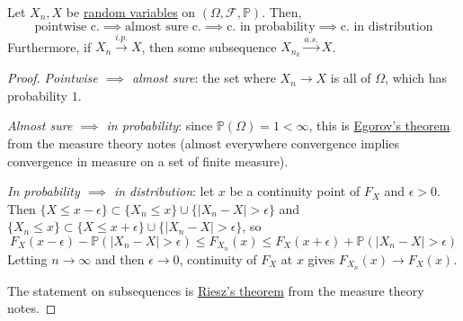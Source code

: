   \begin{theorem}
    \label{thm:hierarchy-of-convergence}
    Let $X_n, X$ be \hyperref[def:random-variable]{random variables} on $(\Omega, \mathcal{F}, \mathbb{P})$. Then, 
    \begin{equation}
      \text{pointwise c.} \implies \text{almost sure c.} \implies \text{c. in probability} \implies \text{c. in distribution}
    \end{equation}
    Furthermore, if $X_n \xrightarrow{i.p.} X$, then some subsequence $X_{n_k} \xrightarrow{a.s.} X$. 
  \end{theorem}
  \begin{proof}
    \textit{Pointwise $\implies$ almost sure}: the set where $X_n \to X$ is all of $\Omega$, which has probability $1$. 

    \textit{Almost sure $\implies$ in probability}: since $\mathbb{P}(\Omega) = 1 < \infty$, this is \hyperref[mt-thm:egorovs-theorem]{Egorov's theorem} from the measure theory notes (almost everywhere convergence implies convergence in measure on a set of finite measure). 

    \textit{In probability $\implies$ in distribution}: let $x$ be a continuity point of $F_X$ and $\epsilon > 0$. Then $\{X \leq x - \epsilon\} \subset \{X_n \leq x\} \cup \{|X_n - X| > \epsilon\}$ and $\{X_n \leq x\} \subset \{X \leq x + \epsilon\} \cup \{|X_n - X| > \epsilon\}$, so 
    \begin{equation}
      F_X (x - \epsilon) - \mathbb{P}(|X_n - X| > \epsilon) \leq F_{X_n} (x) \leq F_X (x + \epsilon) + \mathbb{P}(|X_n - X| > \epsilon)
    \end{equation}
    Letting $n \to \infty$ and then $\epsilon \to 0$, continuity of $F_X$ at $x$ gives $F_{X_n} (x) \to F_X (x)$. 

    The statement on subsequences is \hyperref[mt-thm:riesz]{Riesz's theorem} from the measure theory notes. 
  \end{proof}

